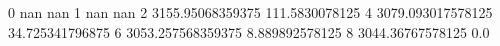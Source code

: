 0 nan nan
1 nan nan
2 3155.95068359375 111.5830078125
4 3079.093017578125 34.725341796875
6 3053.257568359375 8.889892578125
8 3044.36767578125 0.0

